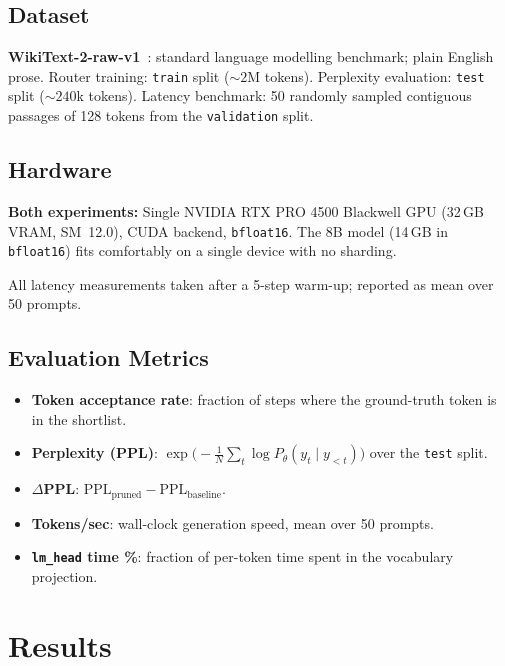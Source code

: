 \documentclass[twocolumn,10pt]{article}
\newcommand{\code}[1]{\texttt{#1}}
\begin{document}
\subsection{Dataset}
\textbf{WikiText-2-raw-v1}~\cite{merity2016}: standard language modelling
benchmark; plain English prose. Router training: \code{train} split
(${\sim}2$M tokens). Perplexity evaluation: \code{test} split
(${\sim}240$k tokens). Latency benchmark: 50 randomly sampled contiguous
passages of 128 tokens from the \code{validation} split.

\subsection{Hardware}
\textbf{Both experiments:} Single NVIDIA RTX PRO 4500 Blackwell GPU (32\,GB
VRAM, SM~12.0), CUDA backend, \code{bfloat16}. The 8B model (14\,GB in
\code{bfloat16}) fits comfortably on a single device with no sharding.

All latency measurements taken after a 5-step warm-up; reported as mean over
50 prompts.

\subsection{Evaluation Metrics}

\begin{itemize}[leftmargin=*, itemsep=1pt, topsep=2pt]
  \item \textbf{Token acceptance rate}: fraction of steps where the
        ground-truth token is in the shortlist.
  \item \textbf{Perplexity (PPL)}: $\exp\!\bigl(-\frac{1}{N}\sum_t \log
        P_\theta(y_t \mid y_{<t})\bigr)$ over the \code{test} split.
  \item \textbf{$\Delta$PPL}: $\text{PPL}_{\text{pruned}} -
        \text{PPL}_{\text{baseline}}$.
  \item \textbf{Tokens/sec}: wall-clock generation speed, mean over 50 prompts.
  \item \textbf{\code{lm\_head} time \%}: fraction of per-token time spent in
        the vocabulary projection.
\end{itemize}

\section{Results}
\end{document}
